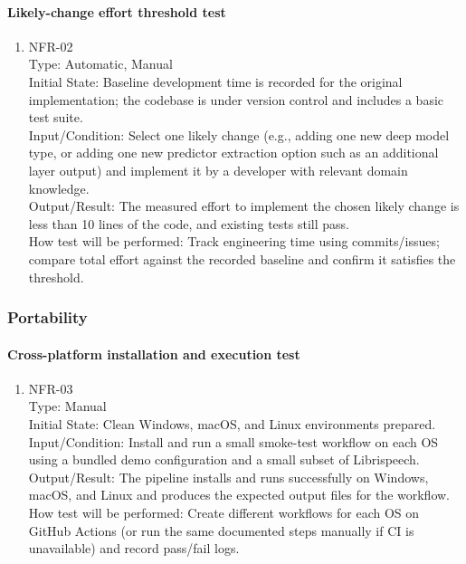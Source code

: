 \documentclass[12pt, titlepage]{article}
\begin{document}
\paragraph{Likely-change effort threshold test}

\begin{enumerate}

\item{NFR-02\\}
Type: Automatic, Manual \\
Initial State: Baseline development time is recorded for the original implementation; the codebase is under version control and includes a basic test suite. \\
Input/Condition: Select one likely change (e.g., adding one new deep model type, or adding one new predictor extraction option such as an additional layer output) and implement it by a developer with relevant domain knowledge. \\
Output/Result: The measured effort to implement the chosen likely change is less than 10 lines of the code, and existing tests still pass. \\
How test will be performed: Track engineering time using commits/issues; compare total effort against the recorded baseline and confirm it satisfies the threshold.

\end{enumerate}

\subsubsection{Portability}

\paragraph{Cross-platform installation and execution test}

\begin{enumerate}

\item{NFR-03\\}
Type: Manual \\
Initial State: Clean Windows, macOS, and Linux environments prepared. \\
Input/Condition: Install \progname{} and run a small smoke-test workflow on each OS using a bundled demo configuration and a small subset of Librispeech. \\
Output/Result: The pipeline installs and runs successfully on Windows, macOS, and Linux and produces the expected output files for the workflow. \\
How test will be performed: Create different workflows for each OS on GitHub Actions (or run the same documented steps manually if CI is unavailable) and record pass/fail logs.

\end{enumerate}
\end{document}
